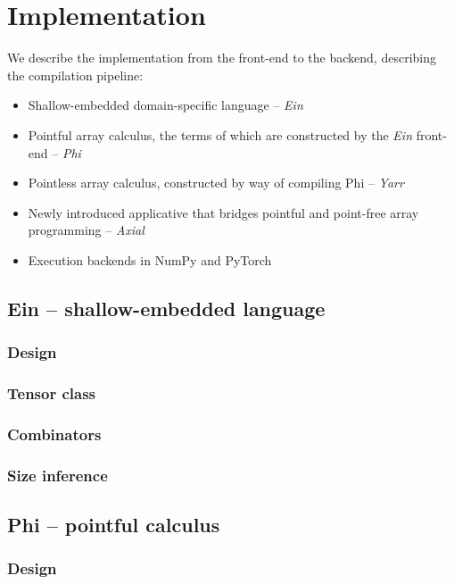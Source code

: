 \chapter{Implementation}

We describe the implementation from the front-end to the backend, describing the compilation pipeline:
\begin{itemize}
    \item Shallow-embedded domain-specific language --  \textit{Ein}
    \item Pointful array calculus, the terms of which are constructed by the \textit{Ein} front-end -- \textit{Phi}
    \item Pointless array calculus, constructed by way of compiling Phi -- \textit{Yarr}
    \item Newly introduced applicative that bridges pointful and point-free array programming -- \textit{Axial}
    \item Execution backends in NumPy and PyTorch
\end{itemize}

\section{Ein -- shallow-embedded language}

\subsection{Design}

\subsection{Tensor class}

\subsection{Combinators}

\subsection{Size inference}

\section{Phi -- pointful calculus}

\subsection{Design}

